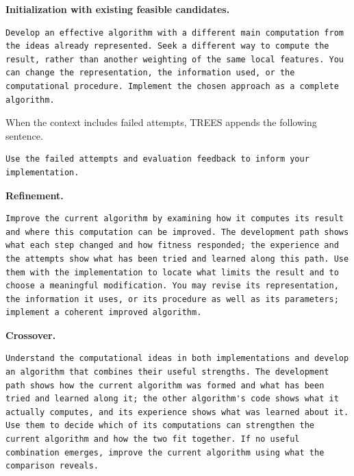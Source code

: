\documentclass{article}
\begin{document}
\noindent\begin{minipage}{\linewidth}
\textbf{Initialization with existing feasible candidates.}

\begin{verbatim}
Develop an effective algorithm with a different main computation from the ideas already represented. Seek a different way to compute the result, rather than another weighting of the same local features. You can change the representation, the information used, or the computational procedure. Implement the chosen approach as a complete algorithm.
\end{verbatim}
\end{minipage}\par

When the context includes failed attempts, TREES appends the following sentence.

\noindent\begin{minipage}{\linewidth}
\begin{verbatim}
Use the failed attempts and evaluation feedback to inform your implementation.
\end{verbatim}
\end{minipage}\par

\noindent\begin{minipage}{\linewidth}
\textbf{Refinement.}

\begin{verbatim}
Improve the current algorithm by examining how it computes its result and where this computation can be improved. The development path shows what each step changed and how fitness responded; the experience and the attempts show what has been tried and learned along this path. Use them with the implementation to locate what limits the result and to choose a meaningful modification. You may revise its representation, the information it uses, or its procedure as well as its parameters; implement a coherent improved algorithm.
\end{verbatim}
\end{minipage}\par

\noindent\begin{minipage}{\linewidth}
\textbf{Crossover.}

\begin{verbatim}
Understand the computational ideas in both implementations and develop an algorithm that combines their useful strengths. The development path shows how the current algorithm was formed and what has been tried and learned along it; the other algorithm's code shows what it actually computes, and its experience shows what was learned about it. Use them to decide which of its computations can strengthen the current algorithm and how the two fit together. If no useful combination emerges, improve the current algorithm using what the comparison reveals.
\end{verbatim}
\end{minipage}\par
\end{document}
